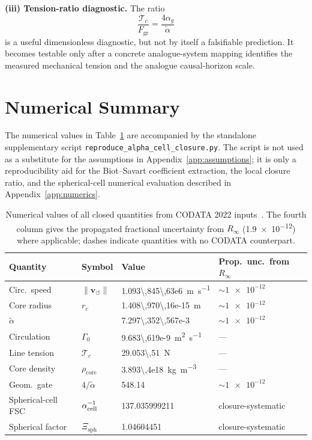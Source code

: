 \documentclass[aps,pra,preprint,longbibliography,nofootinbib]{revtex4-2}
\newcommand{\vnorm}{\lVert\mathbf{v}_{\!\boldsymbol{\circlearrowleft}}\rVert} %
\newcommand{\rhocore}{\rho_{\mathrm{core}}}      %
\newcommand{\rc}{r_c}                            %
\newcommand{\Rinf}{R_\infty}                     %
\newcommand{\Tc}{\mathcal{T}_c}                  %
\newcommand{\Fgr}{F_{\mathrm{gr}}}              %
\newcommand{\Gz}{\Gamma_0}                       %
\newcommand{\Xsph}{\Xi_{\mathrm{sph}}}             %
\begin{document}
\medskip
\noindent\textbf{(iii) Tension-ratio diagnostic.}
The ratio
\begin{equation}
  \frac{\Tc}{\Fgr}=\frac{4\alpha_g}{\tilde\alpha}
  \label{eq:tension_ratio_diagnostic}
\end{equation}
is a useful dimensionless diagnostic, but not by itself a falsifiable
prediction.  It becomes testable only after a concrete analogue-system
mapping identifies the measured mechanical tension and the analogue
causal-horizon scale.

\section{Numerical Summary}
\label{sec:numerical}

The numerical values in Table~\ref{tab:numbers} are accompanied by the
standalone supplementary script
\texttt{reproduce\_alpha\_cell\_closure.py}.  The script is not used as a
substitute for the assumptions in Appendix~\ref{app:assumptions}; it is
only a reproducibility aid for the Biot--Savart coefficient extraction,
the local closure ratio, and the spherical-cell numerical evaluation
described in Appendix~\ref{app:numerics}.

\begin{table}[h]
\centering
\caption{Numerical values of all closed quantities from CODATA 2022
inputs~\cite{MohrTaylor2022}.
The fourth column gives the propagated fractional uncertainty from $\Rinf$
(\num{1.9e-12}) where applicable; dashes indicate quantities with no
CODATA counterpart.}
\label{tab:numbers}
\begin{tabular}{llll}
\toprule
Quantity & Symbol & Value & Prop.\ unc.\ from $\Rinf$ \\
\midrule
Circ.\ speed   & $\vnorm$ & \SI{1.093\,845\,63e6}{\m\per\s}      & $\sim\num{1e-12}$ \\
Core radius    & $\rc$    & \SI{1.408\,970\,16e-15}{\meter}       & $\sim\num{1e-12}$ \\
$\tilde\alpha$ &          & \num{7.297\,352\,567e-3}              & $\sim\num{1e-12}$ \\
Circulation    & $\Gz$    & \SI{9.683\,619e-9}{\m\squared\per\s}  & — \\
Line tension   & $\Tc$    & \SI{29.053\,51}{\newton}               & — \\
Core density   & $\rhocore$& \SI{3.893\,4e18}{\kg\per\m\cubed}    & — \\
Geom.\ gate    & $4/\tilde\alpha$ & \num{548.14}               & $\sim\num{1e-12}$ \\
Spherical-cell FSC & $\alpha_{\rm cell}^{-1}$ & \num{137.035999211} & closure-systematic \\
Spherical factor & $\Xsph$ & \num{1.04604451} & closure-systematic \\
\bottomrule
\end{tabular}
\end{table}
\end{document}
